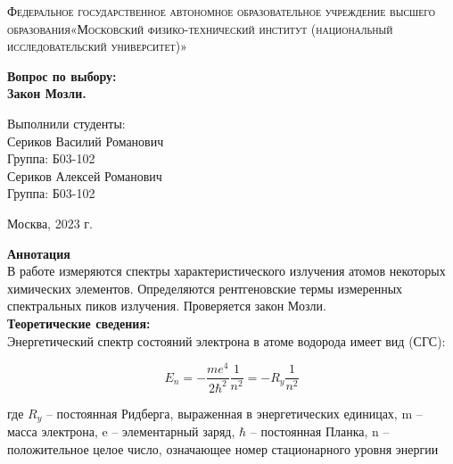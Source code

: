 \documentclass[a4paper, 12pt]{article}%
\begin{document}
	\begin{titlepage}
		\begin{center}
			\textsc{Федеральное государственное автономное образовательное учреждение высшего образования«Московский физико-технический институт (национальный исследовательский университет)»\\[5mm]
			}
			
			\vfill
			
			\textbf{Вопрос по выбору: \\[3mm]
				Закон Мозли.
				\\[50mm]
			}
			
		\end{center}
		
		\hfill
		\begin{minipage}{.5\textwidth}
			Выполнили студенты:\\[2mm]
			Сериков Василий Романович\\[2mm]
			Группа: Б03-102\\[5mm]
			Сериков Алексей Романович\\[2mm]
			Группа: Б03-102\\[5mm]
			
		\end{minipage}
		\vfill
		\begin{center}
			Москва, 2023 г.
		\end{center}
		
	\end{titlepage}
	
	\newpage
	\textbf{Аннотация}\\
	
	В работе измеряются спектры характеристического излучения
	атомов некоторых химических элементов. Определяются рентгеновские
	термы измеренных спектральных пиков излучения. Проверяется закон Мозли.\\
	
	\textbf{Теоретические сведения: }\\
	
	Энергетический спектр состояний электрона в
	атоме водорода имеет вид (СГС):
	
	\begin{equation}
		E_n=-\frac{m e^4}{2 \hbar^2} \frac{1}{n^2}=-R_y \frac{1}{n^2}
	\end{equation}
	
	где $R_y$ – постоянная Ридберга, выраженная в энергетических единицах, m – масса электрона, e – элементарный заряд, $\hbar$ – постоянная
	Планка, n – положительное целое число, означающее номер стационарного уровня энергии
	
\end{document}
